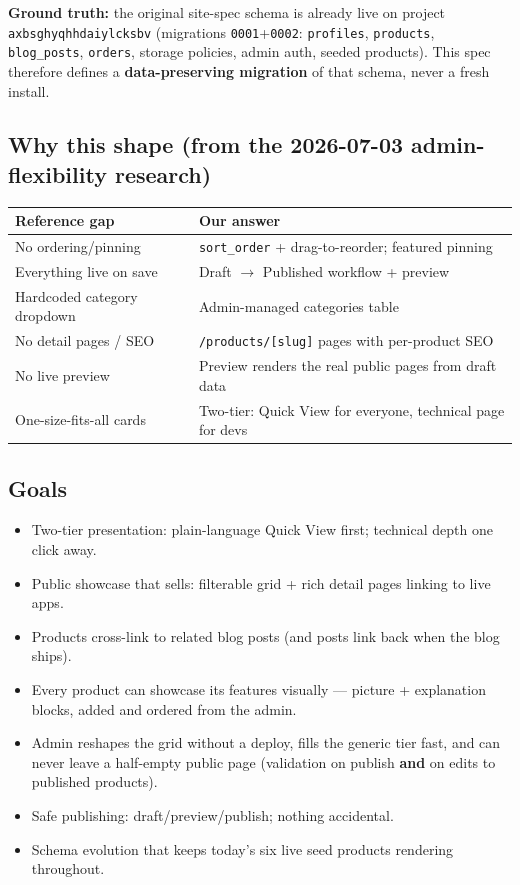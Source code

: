 \documentclass[11pt,a4paper]{article}
\begin{document}
\textbf{Ground truth:} the original site-spec schema is already live on project
\texttt{axbsghyqhhdaiylcksbv} (migrations \texttt{0001}+\texttt{0002}: \texttt{profiles},
\texttt{products}, \texttt{blog\_posts}, \texttt{orders}, storage policies, admin auth,
seeded products). This spec therefore defines a \textbf{data-preserving migration} of that
schema, never a fresh install.

\subsection{Why this shape (from the 2026-07-03 admin-flexibility research)}
\begin{center}
\begin{tabularx}{\textwidth}{Y Y}
\toprule
\textbf{Reference gap} & \textbf{Our answer}\\
\midrule
No ordering/pinning & \texttt{sort\_order} + drag-to-reorder; featured pinning\\
Everything live on save & Draft $\rightarrow$ Published workflow + preview\\
Hardcoded category dropdown & Admin-managed categories table\\
No detail pages / SEO & \texttt{/products/[slug]} pages with per-product SEO\\
No live preview & Preview renders the real public pages from draft data\\
One-size-fits-all cards & Two-tier: Quick View for everyone, technical page for devs\\
\bottomrule
\end{tabularx}
\end{center}

\subsection{Goals}
\begin{itemize}
  \item Two-tier presentation: plain-language Quick View first; technical depth one click away.
  \item Public showcase that sells: filterable grid + rich detail pages linking to live apps.
  \item Products cross-link to related blog posts (and posts link back when the blog ships).
  \item Every product can showcase its features visually --- picture + explanation blocks,
        added and ordered from the admin.
  \item Admin reshapes the grid without a deploy, fills the generic tier fast, and can never
        leave a half-empty public page (validation on publish \textbf{and} on edits to
        published products).
  \item Safe publishing: draft/preview/publish; nothing accidental.
  \item Schema evolution that keeps today's six live seed products rendering throughout.
\end{itemize}
\end{document}
